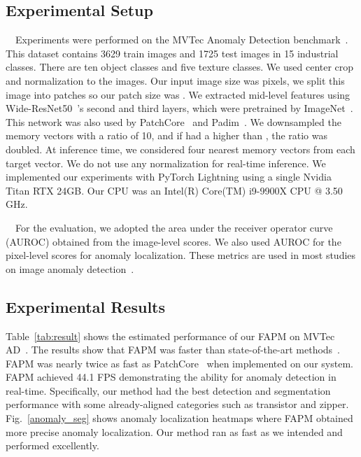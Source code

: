 \documentclass{article}
\begin{document}
	\subsection{Experimental Setup}
	\vspace{-0.15cm}
~~Experiments were performed on the MVTec Anomaly Detection benchmark~\cite{mvtec}. This dataset contains 3629 train images and 1725 test images in 15 industrial classes. There are ten object classes and five texture classes. We used center crop and normalization to the images. Our input image size was  pixels, we split this image into  patches so our patch size was . We extracted mid-level features using Wide-ResNet50~\cite{WRN}’s second and third layers, which were pretrained by ImageNet~\cite{imagenet}. This network was also used by PatchCore~\cite{patchcore} and Padim~\cite{Padim}. We downsampled the memory vectors with a ratio of 10, and if  had a higher  than , the ratio was doubled. At inference time, we considered four nearest memory vectors from each target vector. We do not use any normalization for real-time inference. We implemented our experiments with PyTorch Lightning using a single Nvidia Titan RTX 24GB. Our CPU was an Intel(R) Core(TM) i9-9900X CPU @ 3.50 GHz.


	~~For the evaluation, we adopted the area under the receiver operator curve (AUROC) obtained from the image-level scores. We also used AUROC for the pixel-level scores for anomaly localization. These metrics are used in most studies on image anomaly detection~\cite{differnet,Padim,patchcore,patchsvdd,SPADE,cflow}.
 \vspace{-0.4cm}
	\subsection{Experimental Results}
 \vspace{-0.2cm}
	Table~\ref{tab:result} shows the estimated performance of our FAPM on MVTec AD~\cite{mvtec}. The results show that FAPM was faster than state-of-the-art methods~\cite{differnet,Padim,patchcore,patchsvdd,SPADE,cflow}. FAPM was nearly twice as fast as PatchCore~\cite{patchcore} when implemented on our system. FAPM achieved 44.1 FPS demonstrating the ability for anomaly detection in real-time. Specifically, our method had the best detection and segmentation performance with some already-aligned categories such as transistor and zipper. Fig.~\ref{anomaly_seg} shows anomaly localization heatmaps where FAPM obtained more precise anomaly localization. Our method ran as fast as we intended and performed excellently.
\end{document}
